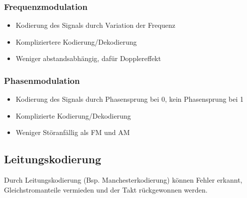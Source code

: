 \documentclass[a4paper]{article}
\begin{document}
\subsubsection{Frequenzmodulation}
\begin{itemize}
    \item Kodierung des Signals durch Variation der Frequenz
    \item Kompliziertere Kodierung/Dekodierung
    \item Weniger abstandsabhängig, dafür Dopplereffekt
\end{itemize}

\subsubsection{Phasenmodulation}
\begin{itemize}
    \item Kodierung des Signals durch Phasensprung bei 0, kein Phasensprung bei 1
    \item Komplizierte Kodierung/Dekodierung
    \item Weniger Störanfällig als FM und AM
\end{itemize}

\subsection{Leitungskodierung}
Durch Leitungskodierung (Bsp. Manchesterkodierung) können Fehler erkannt, Gleichstromanteile vermieden und der Takt rückgewonnen werden.
\end{document}
